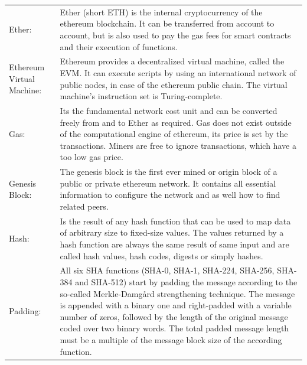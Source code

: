 \clearpage

\begin{center}
	\begin{tabular}{ p{4cm} p{8cm} } 
		Ether: & Ether (short ETH) is the internal cryptocurrency of the ethereum blockchain. It can be transferred from account to account, but is also used to pay the gas fees for smart contracts and their execution of functions. \\
		Ethereum Virtual Machine: & Ethereum provides a decentralized virtual machine, called the \ac{EVM}. It can execute scripts by using an international network of public nodes, in case of the ethereum public chain. The virtual machine's instruction set is Turing-complete. \\
		Gas: & Its the fundamental network cost unit and can be converted freely from and to Ether as required. Gas does not exist outside of the computational engine of ethereum, its price is set by the transactions. Miners are free to ignore transactions, which have a too low gas price. \\
		Genesis Block: & The genesis block is the first ever mined or origin block of a public or private ethereum network. It contains all essential information to configure the network and as well how to find related peers. \\
		Hash: & Is the result of any hash function that can be used to map data of arbitrary size to fixed-size values. The values returned by a hash function are always the same result of same input and are called hash values, hash codes, digests or simply hashes. \\
		Padding: & All six SHA functions (SHA-0, SHA-1, SHA-224, SHA-256, SHA-384 and SHA-512) start by padding the message according to the so-called Merkle-Damg{\aa}rd strengthening technique. The message is appended with a binary one and right-padded with a variable number of zeros, followed by the length of the original message coded over two binary words. The total padded message length must be a multiple of the message block size of the according function. \\
	\end{tabular}
\end{center}

\clearpage

